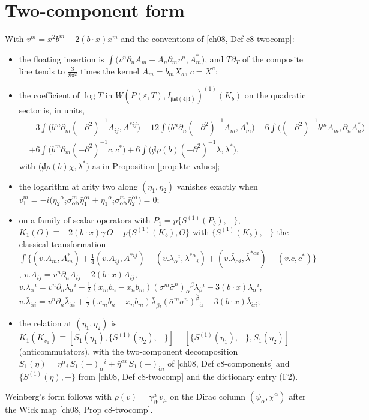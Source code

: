 \section{Two-component form}

\begin{proposition}
\label{prop:ktr-twocomp}
With $v^m=x^2b^m-2(b\cdot x)x^m$ and the conventions of [ch08, Def c8-twocomp]:
\begin{itemize}
\item the floating insertion is $\int\big(v^n\partial_nA_m+A_n\partial_mv^n,A^*_m\big)$, and $T\partial_T$ of the composite line tends to $\tfrac3{8\pi^2}$ times the kernel $A_m=b_mX_a$, $c=X^a$;
\item the coefficient of $\log T$ in $W(P(\varepsilon,T),I_{\mathfrak{psl}(4|4)})^{(1)}(K_b)$ on the quadratic sector is, in units,
\[
\begin{aligned}
&-3\int\big(b^m\partial_m(-\partial^2)^{-1}A_{ij},A^{*ij}\big)-12\int\big(b^n\partial_n(-\partial^2)^{-1}A_m,A^*_m\big)-6\int\big((-\partial^2)^{-1}b^mA_m,\partial_nA^*_n\big)\\
&+6\int\big(b^m\partial_m(-\partial^2)^{-1}c,c^*\big)+6\int\big({\not d}\rho(b)(-\partial^2)^{-1}\lambda,\lambda^*\big),
\end{aligned}
\]
with $\big({\not d}\rho(b)\chi,\lambda^*\big)$ as in Proposition \ref{prop:ktr-values};
\item the logarithm at arity two along $(\eta_1,\eta_2)$ vanishes exactly when $v_1^m=-i\big(\eta_2{}^\alpha{}_i\sigma^m_{\alpha\dot\alpha}\bar\eta_1^{\dot\alpha i}+\eta_1{}^\alpha{}_i\sigma^m_{\alpha\dot\alpha}\bar\eta_2^{\dot\alpha i}\big)=0$;
\item on a family of scalar operators with $P_1=p\{S^{(1)}(P_b),-\}$, $K_1(O)\equiv-2(b\cdot x)\gamma\,O-p\{S^{(1)}(K_b),O\}$ with $\{S^{(1)}(K_b),-\}$ the classical transformation $\int\big\{(v.A_m,A^*_m)+\tfrac14(v.A_{ij},A^{*ij})-(v.\lambda_\alpha{}^i,\lambda^{*\alpha}{}_i)+(v.\bar\lambda_{\dot\alpha i},\bar\lambda^{*\dot\alpha i})-(v.c,c^*)\big\}$, $v.A_{ij}=v^n\partial_nA_{ij}-2(b\cdot x)A_{ij}$, $v.\lambda_\alpha{}^i=v^n\partial_n\lambda_\alpha{}^i-\tfrac12(x_mb_n-x_nb_m)(\sigma^m\bar\sigma^n)_\alpha{}^\beta\lambda_\beta{}^i-3(b\cdot x)\lambda_\alpha{}^i$, $v.\bar\lambda_{\dot\alpha i}=v^n\partial_n\bar\lambda_{\dot\alpha i}+\tfrac12(x_mb_n-x_nb_m)\bar\lambda_{\dot\beta i}(\bar\sigma^m\sigma^n)^{\dot\beta}{}_{\dot\alpha}-3(b\cdot x)\bar\lambda_{\dot\alpha i}$;
\item the relation at $(\eta_1,\eta_2)$ is $K_1(K_{v_1})\equiv[S_1(\eta_1),\{S^{(1)}(\eta_2),-\}]+[\{S^{(1)}(\eta_1),-\},S_1(\eta_2)]$ (anticommutators), with the two-component decomposition $S_1(\eta)=\eta^\alpha{}_i\,S_1(-)_\alpha{}^i+\bar\eta^{\dot\alpha i}\,\bar S_1(-)_{\dot\alpha i}$ of [ch08, Def c8-components] and $\{S^{(1)}(\eta),-\}$ from [ch08, Def c8-twocomp] and the dictionary entry (F2).
\end{itemize}
Weinberg's form follows with $\rho(v)=\gamma_W^\mu v_\mu$ on the Dirac column $(\psi_\alpha,\bar\chi^{\dot\alpha})$ after the Wick map [ch08, Prop c8-twocomp].
\end{proposition}

